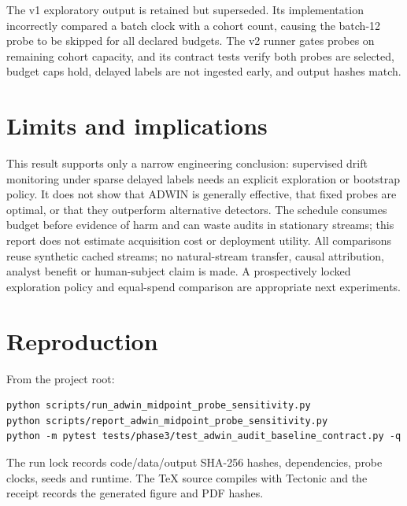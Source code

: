 \documentclass[10pt]{article}
\begin{document}
The v1 exploratory output is retained but superseded. Its implementation incorrectly compared a batch clock with a cohort count, causing the batch-12 probe to be skipped for all declared budgets. The v2 runner gates probes on remaining cohort capacity, and its contract tests verify both probes are selected, budget caps hold, delayed labels are not ingested early, and output hashes match.
\section{Limits and implications}
This result supports only a narrow engineering conclusion: supervised drift monitoring under sparse delayed labels needs an explicit exploration or bootstrap policy. It does not show that ADWIN is generally effective, that fixed probes are optimal, or that they outperform alternative detectors. The schedule consumes budget before evidence of harm and can waste audits in stationary streams; this report does not estimate acquisition cost or deployment utility. All comparisons reuse synthetic cached streams; no natural-stream transfer, causal attribution, analyst benefit or human-subject claim is made. A prospectively locked exploration policy and equal-spend comparison are appropriate next experiments.
\section{Reproduction}
From the project root:
\begin{verbatim}
python scripts/run_adwin_midpoint_probe_sensitivity.py
python scripts/report_adwin_midpoint_probe_sensitivity.py
python -m pytest tests/phase3/test_adwin_audit_baseline_contract.py -q
\end{verbatim}
The run lock records code/data/output SHA-256 hashes, dependencies, probe clocks, seeds and runtime. The TeX source compiles with Tectonic and the receipt records the generated figure and PDF hashes.
\end{document}

